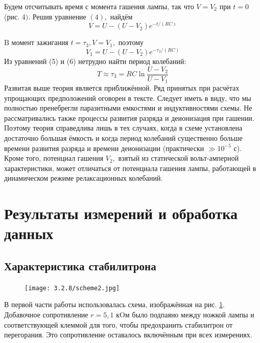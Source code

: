\documentclass[a4paper,12pt]{article} %
\begin{document}
Будем отсчитывать время с момента гашения лампы, так что $V=V_{2}$ при $t=0$ (рис. 4$) .$ Решив уравнение $(4),$ найдём
\begin{equation}
 V=U-\left(U-V_{2}\right) e^{-t /(R C)}   
\end{equation}


$\mathrm{B}$ момент зажигания $t=\tau_{3}, V=V_{1},$ поэтому
\begin{equation}
V_{1}=U-\left(U-V_{2}\right) e^{-\tau_{3} /(R C)}
\end{equation}
Из уравнений (5) и (6) нетрудно найти период колебаний:
$$
T \approx \tau_{3}=R C \ln \frac{U-V_{2}}{U-V_{1}}
$$
Развитая выше теория является приближённой. Ряд принятых при расчётах упрощающих предположений оговорен в тексте. Следует иметь в виду, что мы полностью пренебрегли паразитными емкостями и индуктивностями схемы. Не
рассматривались также процессы развития разряда и деионизация при гашении. Поэтому теория справедлива лишь в тех случаях, когда в схеме установлена достаточно большая ёмкость и когда период колебаний существенно больше времени развития разряда и времени деионизации (практически $\gg 10^{-5}$ с). Кроме того, потенциал гашения $V_{2},$ взятый из статической вольт-амперной характеристики, может отличаться от потенциала гашения лампы, работающей в динамическом режиме релаксационных колебаний.

\section{Результаты измерений и обработка данных}


\subsection{Характеристика стабилитрона}

\begin{figure} 
\begin{center}
\texttt{[image: 3.2.8/scheme2.jpg]}
\caption{}
\label{scheme}
\end{center}
\end{figure}

В первой части работы использовалась схема, изображённая на рис. \ref{scheme}. Добавочное сопротивление $r = 5,1$ кOм было подпаяно между ножкой лампы и соответствующей клеммой для того, чтобы предохранить стабилитрон от перегорания. Это сопротивление оставалось включённым при всех измерениях. 
\end{document}
